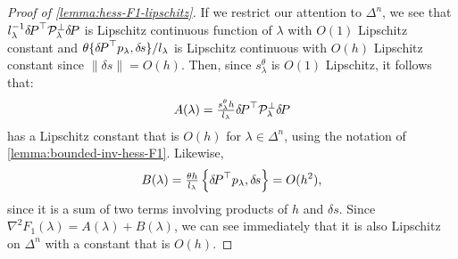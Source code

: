 \documentclass{article}
\begin{document}
\begin{proof}[Proof of \cref{lemma:hess-F1-lipschitz}]
  If we restrict our attention to $\Delta^n$, we see that
  $l_\lambda^{-1} {\delta \hspace{-0.14em} P}^\top \mathcal{P}_\lambda^\perp {\delta \hspace{-0.14em} P}$ is
  Lipschitz continuous function of $\lambda$ with $O(1)$ Lipschitz
  constant and $\theta \{{{\delta \hspace{-0.14em} P}}^\top p_\lambda, {\delta \hspace{-0.1em} s}\} /l_{\lambda}$
  is Lipschitz continuous with $O(h)$ Lipschitz constant since
  $\|\delta s\| = O(h)$. Then, since $s^\theta_\lambda$ is $O(1)$
  Lipschitz, it follows that:
  \begin{equation}
    A(\lambda) = \tfrac{s^\theta_\lambda h}{l_\lambda} {\delta \hspace{-0.14em} P}^\top
    \mathcal{P}^\perp_\lambda {\delta \hspace{-0.14em} P}
  \end{equation}
  has a Lipschitz constant that is $O(h)$ for $\lambda \in \Delta^n$,
  using the notation of \cref{lemma:bounded-inv-hess-F1}. Likewise,
  \begin{equation}
    B(\lambda) = \tfrac{\theta h}{l_\lambda} \left\{{\delta \hspace{-0.14em} P}^\top
      p_\lambda, {\delta \hspace{-0.1em} s}\right\} = O(h^2),
  \end{equation}
  since it is a sum of two terms involving products of $h$ and
  $\delta s$. Since $\nabla^2 F_1(\lambda) = A(\lambda) + B(\lambda)$,
  we can see immediately that it is also Lipschitz on $\Delta^n$ with
  a constant that is $O(h)$.
\end{proof}
\end{document}
